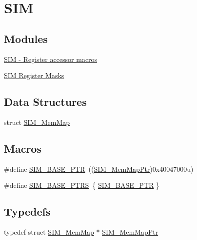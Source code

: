 \hypertarget{group___s_i_m___peripheral}{}\section{S\+IM}
\label{group___s_i_m___peripheral}
\subsection*{Modules}
\begin{DoxyCompactItemize}
\item 
\hyperlink{group___s_i_m___register___accessor___macros}{S\+I\+M -\/ Register accessor macros}
\item 
\hyperlink{group___s_i_m___register___masks}{S\+I\+M Register Masks}
\end{DoxyCompactItemize}
\subsection*{Data Structures}
\begin{DoxyCompactItemize}
\item 
struct \hyperlink{struct_s_i_m___mem_map}{S\+I\+M\+\_\+\+Mem\+Map}
\end{DoxyCompactItemize}
\subsection*{Macros}
\begin{DoxyCompactItemize}
\item 
\#define \hyperlink{group___s_i_m___peripheral_ga719ec5df95fbb5732438f794f2cccf3c}{S\+I\+M\+\_\+\+B\+A\+S\+E\+\_\+\+P\+TR}~((\hyperlink{group___s_i_m___peripheral_ga708a122e8ca55082e0cf67cab6a77d02}{S\+I\+M\+\_\+\+Mem\+Map\+Ptr})0x40047000u)
\item 
\#define \hyperlink{group___s_i_m___peripheral_ga2fd213a3b9fc7d761ab0cdeb74c34f91}{S\+I\+M\+\_\+\+B\+A\+S\+E\+\_\+\+P\+T\+RS}~\{ \hyperlink{group___s_i_m___peripheral_ga719ec5df95fbb5732438f794f2cccf3c}{S\+I\+M\+\_\+\+B\+A\+S\+E\+\_\+\+P\+TR} \}
\end{DoxyCompactItemize}
\subsection*{Typedefs}
\begin{DoxyCompactItemize}
\item 
typedef struct \hyperlink{struct_s_i_m___mem_map}{S\+I\+M\+\_\+\+Mem\+Map} $\ast$ \hyperlink{group___s_i_m___peripheral_ga708a122e8ca55082e0cf67cab6a77d02}{S\+I\+M\+\_\+\+Mem\+Map\+Ptr}
\end{DoxyCompactItemize}


